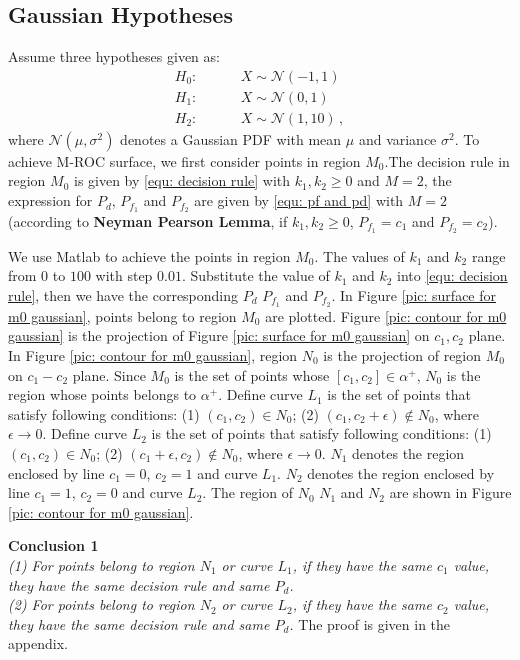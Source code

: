 \documentclass[12pt,journal,a4paper,twoside,onecolumn]{IEEEtran}
\begin{document}
\begin{spacing}{2.5}
\subsection{Gaussian Hypotheses}
Assume three hypotheses given as:
\begin{equation}
\label{equ: Gaussian Hypothesis}
\begin{split}
	H_0:\;\;\;\;\;\;\;\;&X \sim \mathcal{N}(-1,1)\\
    H_1:\;\;\;\;\;\;\;\;&X \sim \mathcal{N}(0,1)\\
    H_2:\;\;\;\;\;\;\;\;&X \sim \mathcal{N}(1,10)\,,
\end{split}
\end{equation}
where $\mathcal{N}(\mu,\sigma^2)$ denotes a Gaussian PDF with mean $\mu$ and variance $\sigma^2$.
To achieve M-ROC surface, we first consider points in region $M_0$.The decision rule in region $M_0$ is given by \eqref{equ: decision rule}
with $k_1, k_2 \geq 0$ and $M = 2$, the expression for $P_d$, $P_{f_1}$ and $P_{f_2}$ are given by \eqref{equ: pf and pd} with $M = 2$ (according to \textbf{Neyman Pearson Lemma}, if $k_1, k_2 \geq 0$, $P_{f_1} = c_1$ and $P_{f_2} = c_2$).

We use Matlab to achieve the points in region $M_0$. The values of $k_1$ and $k_2$ range from $0$ to $100$ with step $0.01$. Substitute the value of $k_1$ and $k_2$ into \eqref{equ: decision rule}, then we have the corresponding $P_d$ $P_{f_1}$ and $P_{f_2}$.  In Figure \ref{pic: surface for m0 gaussian}, points belong to region $M_0$ are plotted.
Figure \ref{pic: contour for m0 gaussian} is the projection of Figure \ref{pic: surface for m0 gaussian} on $c_1, c_2$ plane.
In Figure \ref{pic: contour for m0 gaussian}, region $N_0$ is the projection of region $M_0$ on $c_1 - c_2$ plane. Since $M_0$ is the set of points whose $[c_1, c_2] \in \alpha^+$, $N_0$ is the region whose points belongs to $\alpha^+$.
Define curve $L_1$ is the set of points that satisfy following conditions: (1) $(c_1, c_2) \in N_0$; (2) $(c_1, c_2+\epsilon) \notin N_0$, where $\epsilon \rightarrow 0$. Define curve $L_2$ is the set of points that satisfy following conditions: (1) $(c_1, c_2) \in N_0$; (2) $(c_1 + \epsilon, c_2) \notin N_0$, where $\epsilon \rightarrow 0$.
$N_1$ denotes the region enclosed by line $c_1 = 0$, $c_2 = 1$ and curve $L_1$.
$N_2$ denotes the region enclosed by line $c_1 = 1$, $c_2 = 0$ and curve $L_2$.
The region of $N_0$ $N_1$ and $N_2$ are shown in Figure \ref{pic: contour for m0 gaussian}.

\textbf{Conclusion 1}
\textit{\\(1) For points belong to region $N_1$ or curve $L_1$, if they have the same $c_1$ value, they have the same decision rule and same $P_d$.
\\(2) For points belong to region $N_2$ or curve $L_2$, if they have the same $c_2$ value, they have the same decision rule and same $P_d$.
}
The proof is given in the appendix.



\end{spacing}
\end{document}
